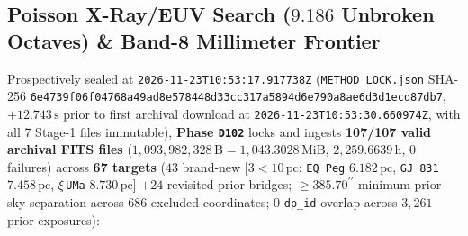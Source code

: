 \documentclass[twocolumn,10pt]{article}
\begin{document}
\subsection{Poisson X-Ray/EUV Search ($9.186$ Unbroken Octaves) \& Band-8 Millimeter Frontier}
Prospectively sealed at \texttt{2026-11-23T10:53:17.917738Z} (\texttt{METHOD\_LOCK.json} SHA-256 \texttt{6e4739f0\allowbreak 6f04768a\allowbreak 49ad8e57\allowbreak 8448d33c\allowbreak c317a589\allowbreak 4d6e790a\allowbreak 8ae6d3d1\allowbreak ecd87db7}, $+12.743\,\text{s}$ prior to first archival download at \texttt{2026-11-23T10:53:30.660974Z}, with all 7 Stage-1 files immutable), \textbf{Phase \texttt{D102}} locks and ingests \textbf{107/107 valid archival FITS files} ($1{,}093{,}982{,}328\,\text{B} = 1{,}043.3028\,\text{MiB}$, $2{,}259.6639\,\text{h}$, $0$ failures) across \textbf{67 targets} ($43$ brand-new [$3 < 10\,\text{pc}$: \texttt{EQ\,Peg} $6.182\,\text{pc}$, \texttt{GJ\,831} $7.458\,\text{pc}$, $\xi$\,\texttt{UMa} $8.730\,\text{pc}$] $+ 24$ revisited prior bridges; $\ge 385.70^{\prime\prime}$ minimum prior sky separation across $686$ excluded coordinates; $0$ \texttt{dp\_id} overlap across $3{,}261$ prior exposures):
\end{document}
